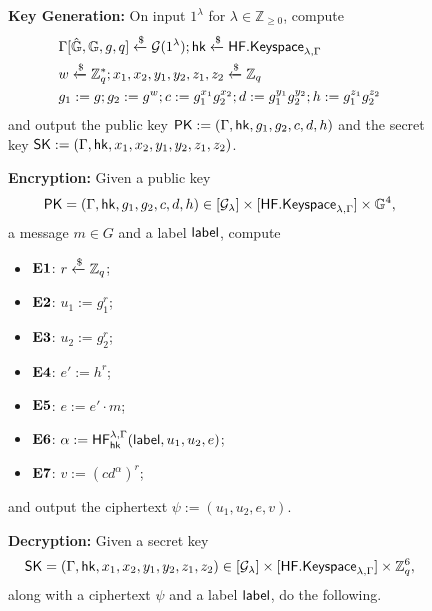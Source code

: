 	\begin{figure}[tbp]
	\begin{framed}\small
		\textbf{Key Generation:} On input $1^\lambda$ for $\lambda\in\mathbb{Z}_{\geq 0}$, compute
		\begin{align*}
			&\Gamma[\hat{\mathbb{G}}, \mathbb{G}, g, q]\xleftarrow{\$}\mathcal{G}(1^\lambda); \mathsf{hk}\xleftarrow{\$}\mathsf{HF.Keyspace}_{\lambda,\Gamma}\\
			&w\xleftarrow{\$}\mathbb{Z}_q^{*}; x_1,x_2,y_1,y_2,z_1,z_2\xleftarrow{\$}\mathbb{Z}_q\\
			&g_1 := g; g_2 := g^{w}; c := g_1^{x_1}g_2^{x_2}; d := g_1^{y_1}g_2^{y_2}; h := g_1^{z_1}g_2^{z_2}
		\end{align*}
		and output the public key $\mathsf{PK} := (\Gamma,\mathsf{hk},g_1,g_2,c,d,h)$ and the secret key $\mathsf{SK} := (\Gamma, \mathsf{hk}, x_1,x_2,y_1,y_2,z_1,z_2)$.
		
		\vspace{4mm}
		
		\textbf{Encryption:} Given a public key $$\mathsf{PK}=(\Gamma,\mathsf{hk},g_1,g_2,c,d,h)\in[\mathcal{G}_\lambda]\times[\mathsf{HF.Keyspace}_{\lambda,\Gamma}]\times\mathbb{G}^4,$$ a message $m\in G$ and a label $\mathsf{label}$, compute
		
		\begin{itemize}
			\itemsep=0em
			\item[]\textbf{$\mathbf{E1}$}: $r\xleftarrow{\$}\mathbb{Z}_q$;
			\item[]\textbf{$\mathbf{E2}$}: $u_1 := g_1^r$;
			\item[]\textbf{$\mathbf{E3}$}: $u_2 := g_2^r$;
			\item[]\textbf{$\mathbf{E4}$}: $e' := h^r$;
			\item[]\textbf{$\mathbf{E5}$}: $e := e'\cdot m$;
			\item[]\textbf{$\mathbf{E6}$}: $\alpha:=\mathsf{HF}^{\lambda,\Gamma}_{\mathsf{hk}}(\mathsf{label}, u_1, u_2, e)$;
			\item[]\textbf{$\mathbf{E7}$}: $v := (cd^\alpha)^r$;
		\end{itemize}
		and output the ciphertext $\psi := (u_1, u_2, e, v)$.
		
		\vspace{4mm}
		
		\textbf{Decryption:} Given a secret key $$\mathsf{SK}=(\Gamma, \mathsf{hk}, x_1,x_2,y_1,y_2,z_1,z_2)\in[\mathcal{G}_\lambda]\times[\mathsf{HF.Keyspace}_{\lambda,\Gamma}]\times\mathbb{Z}_q^{6},$$
		along with a ciphertext $\psi$ and a label $\mathsf{label}$, do the following.
		

\end{framed}
\end{figure}
